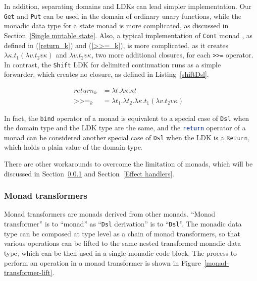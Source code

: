 In addition, separating domains and LDKs can lead simpler implementation. Our \lstinline{Get} and \lstinline{Put} can be used in the domain of ordinary unary functions, while the monadic data type for a state monad is more complicated, as discussed in Section~\ref{Single mutable state}. Also, a typical implementation of \lstinline{Cont} monad \cite{dyvbig2007monadic}, as defined in (\ref{return_k}) and (\ref{>>=_k}), is more complicated, as it creates $\lambda\kappa.t_1\left(\lambda v.t_2 v\kappa\right)$ and $\lambda v.t_2 v\kappa$, two more additional closures, for each \lstinline{>>=} operator. In contrast, the \lstinline{Shift} LDK for delimited continuation runs as a simple forwarder, which creates no closure, as defined in Listing~\ref{shiftDsl}.

\begin{align}
\label{return_k}
return_k &= \lambda t.\lambda \kappa.\kappa t\\
\label{>>=_k}
\texttt{>>=}_k &= \lambda t_1.\lambda t_2.\lambda \kappa.t_1\left(\lambda v.t_2 v\kappa\right)
\end{align}

In fact, the \lstinline{bind} operator of a monad is equivalent to a special case of \lstinline{Dsl} when the domain type and the LDK type are the same, and the \lstinline[language=Haskell,deletekeywords={return}]{return} operator of a monad can be considered another special case of \lstinline{Dsl} when the LDK is a \lstinline{Return}, which holds a plain value of the domain type.

There are other workarounds to overcome the limitation of monads, which will be discussed in Section~\ref{Monad transformers} and Section~\ref{Effect handlers}.

\subsubsection{Monad transformers}\label{Monad transformers}

Monad transformers \cite{liang1995monad} are monads derived from other monads. ``Monad transformer'' is to ``monad'' as ``\lstinline{Dsl} derivation'' is to ``\lstinline{Dsl}''. The monadic data type can be composed at type level as a chain of monad transformers, so that various operations can be lifted to the same nested transformed monadic data type, which can be then used in a single monadic code block. The process to perform an operation in a monad transformer is shown in Figure~\ref{monad-transformer-lift}.

